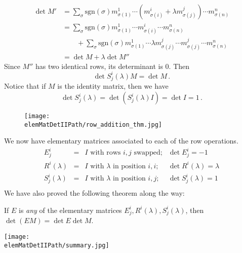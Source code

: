 \begin{align*}
\det M' & = \sum_{\sigma} \text{sgn}(\sigma) m^1_{\sigma(1)}\cdots (m^i_{\sigma(i)}+ \lambda m^j_{\sigma(j)}) \cdots m^n_{\sigma(n)} \\
& = \sum_{\sigma} \text{sgn}(\sigma) m^1_{\sigma(1)}\cdots m^i_{\sigma(i)} \cdots m^n_{\sigma(n)} \\
&   \qquad + \sum_{\sigma} \text{sgn}(\sigma) m^1_{\sigma(1)}\cdots \lambda m^j_{\sigma(j)} \cdots m^j_{\sigma(j)} \cdots m^n_{\sigma(n)} \\
& = \det M + \lambda \det M''
\end{align*}
Since $M''$ has two identical rows, its determinant is $0$.  Then \[\det S^i_j(\lambda)M = \det M\, .\]
Notice that if $M$ is the identity matrix, then we have \[\det S^i_j(\lambda) = \det (S^i_j(\lambda)I) = \det I = 1\, .\]

\begin{figure}
\begin{center}
\texttt{[image: \\elemMatDetIIPath/row\_addition\_thm.jpg]}
\end{center}
\end{figure}

We now have elementary matrices associated to each of the row operations.
\[
\begin{array}{cccc}
E^i_j &=& I \text{ with rows $i,j$ swapped;} &\det E^i_j=-1 \\[3mm]
R^i(\lambda) &=& I \text{ with $\lambda$ in position $i,i$;} 
	&\det R^i(\lambda)=\lambda \\[3mm]
S^i_j(\lambda) &=& I \text{ with $\lambda$ in position $i,j$;} 
	&\det S^i_j(\lambda)=1 \\[3mm]
\end{array}
\]
We have also proved the following theorem along the way:

\begin{theorem}
If $E$ is \emph{any} of the elementary matrices $E^i_j, R^i(\lambda), S^i_j(\lambda)$, then $\det(EM)=\det E \det M$.
\end{theorem}



\begin{center}
\hspace{3mm}\texttt{[image: \\elemMatDetIIPath/summary.jpg]}
\end{center}


